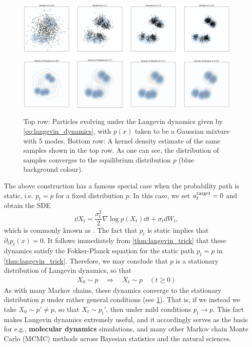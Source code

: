\begin{figure}[!t]
    \centering
    \includegraphics[width=\textwidth]{figures/langevin.png}
    \label{fig:langevin}
    \caption{Top row: Particles evolving under the Langevin dynamics given by \cref{eq:langevin_dynamics}, with $p(x)$ taken to be a Gaussian mixture with 5 modes. Bottom row: A kernel density estimate of the same samples shown in the top row. As one can see, the distribution of samples converges to the equilibrium distribution $p$ (blue background colour).}
\end{figure}
\begin{remarkbox}
The above construction has a famous special case when the probability path is static, i.e. $p_t=p$ for a fixed distribution $p$. In this case, we set $u^{\text{target}}_t=0$ and obtain the SDE
\begin{equation}
    \dd X_t = \frac{\sigma_t^2}{2}\nabla\log p(X_t)\dd t + \sigma_t dW_t \label{eq:langevin_dynamics},
\end{equation}
which is commonly known as . The fact that $p_t$ is static implies that $\partial_tp_t(x)=0$. It follows immediately from \cref{thm:langevin_trick} that these dynamics satisfy the Fokker-Planck equation for the static path $p_t=p$ in \cref{thm:langevin_trick}. Therefore, we may conclude that $p$ is a stationary distribution of Langevin dynamics, so that
\begin{align*}
    X_0 \sim p\quad \Rightarrow \quad X_t \sim p\quad (t\geq 0)
\end{align*}
As with many Markov chains, these dynamics converge to the stationary distribution $p$ under rather general conditions (see \cref{fig:langevin}). That is, if we instead we take $X_0 \sim p' \neq p$, so that $X_t \sim p_t'$, then under mild conditions $p_t \to p$. This fact makes Langevin dynamics extremely useful, and it accordingly serves as the basis for e.g., \textbf{molecular dynamics} simulations, and many other Markov chain Monte Carlo (MCMC) methods across Bayesian statistics and the natural sciences.
\end{remarkbox}

